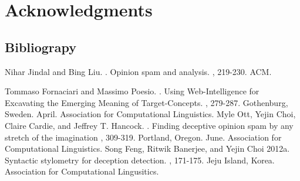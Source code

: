 \documentclass[9pt]{article}
\begin{document}
\section*{Acknowledgments}

%
%

\begin{thebibliography}{}

\section*{Bibliograpy}
Nihar Jindal and Bing Liu.
.
\newblock Opinion spam and analysis. 
, 219-230. ACM.

Tommaso Fornaciari and Massimo Poesio.
.
\newblock Using Web-Intelligence for Excavating the
	Emerging Meaning of Target-Concepts.
, 279-287. Gothenburg, Sweden. April. Association for Computational Linguistics.
Myle Ott, Yejin Choi, Claire Cardie, and Jeffrey T. Hancock.
.
\newblock  Finding deceptive opinion spam by any stretch of the imagination
, 309-319. Portland, Oregon. June. Association for Computational Linguistics.
Song Feng, Ritwik Banerjee, and Yejin Choi
\newblock 2012a.
\newblock Syntactic stylometry for deception detection.
, 171-175. Jeju Island, Korea. Association for Computational Lingusitics.

\end{thebibliography}
\end{document}
